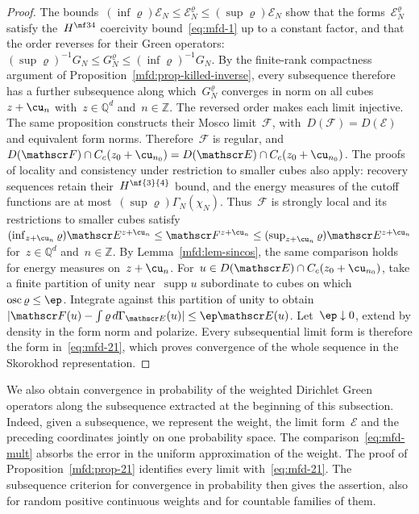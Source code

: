 \documentclass[11pt]{amsart}
\begin{document}
\begin{proof}
The bounds~$(\inf\varrho)\mathscr E_N\leq \mathscr E_N^\varrho\leq(\sup\varrho)\mathscr E_N$ show that the forms~$\mathscr E_N^\varrho$ satisfy the~$H^{\nf34}$ coercivity bound~\eqref{eq:mfd-1} up to a constant factor, and that the order reverses for their Green operators:~$(\sup\varrho)^{-1}G_N\leq G_N^\varrho\leq(\inf\varrho)^{-1}G_N$. By the finite-rank compactness argument of Proposition~\ref{mfd:prop-killed-inverse}, every subsequence therefore has a further subsequence along which~$G_N^\varrho$ converges in norm on all cubes~$z+\cu_n$ with~$z\in\mathbb Q^d$ and~$n\in\mathbb Z$. The reversed order makes each limit injective. The same proposition constructs their Mosco limit~$\mathscr F$, with~$D(\mathscr F)=D(\mathscr E)$ and equivalent form norms. Therefore~$\mathscr F$ is regular, and~$D(\mathscr F)\cap C_c(z_0+\cu_{n_0})=D(\mathscr E)\cap C_c(z_0+\cu_{n_0})$. The proofs of locality and consistency under restriction to smaller cubes also apply: recovery sequences retain their~$H^{\nf{3}{4}}$ bound, and the energy measures of the cutoff functions are at most~$(\sup\varrho)\Gamma_N(\chi_N)$. Thus~$\mathscr F$ is strongly local and its restrictions to smaller cubes satisfy~$(\inf_{z+\cu_n}\varrho)\mathscr E^{z+\cu_n}\leq \mathscr F^{z+\cu_n}\leq(\sup_{z+\cu_n}\varrho)\mathscr E^{z+\cu_n}$ for~$z\in\mathbb Q^d$ and~$n\in\mathbb Z$. By Lemma~\ref{mfd:lem-sincos}, the same comparison holds for energy measures on~$z+\cu_n$. For~$u\in D(\mathscr E)\cap C_c(z_0+\cu_{n_0})$, take a finite partition of unity near~$\operatorname{supp}u$ subordinate to cubes on which~$\operatorname{osc}\varrho\leq\ep$. Integrate against this partition of unity to obtain~$|\mathscr F(u)-\int\varrho\,d\Gamma_{\mathscr E}(u)|\leq\ep \mathscr E(u)$. Let~$\ep\downarrow0$, extend by density in the form norm and polarize. Every subsequential limit form is therefore the form in~\eqref{eq:mfd-21}, which proves convergence of the whole sequence in the Skorokhod representation.
\end{proof}

We also obtain convergence in probability of the weighted Dirichlet Green operators along the subsequence extracted at the beginning of this subsection. Indeed, given a subsequence, we represent the weight, the limit form~$\mathscr E$ and the preceding coordinates jointly on one probability space. The comparison~\eqref{eq:mfd-mult} absorbs the error in the uniform approximation of the weight. The proof of Proposition~\ref{mfd:prop-21} identifies every limit with~\eqref{eq:mfd-21}. The subsequence criterion for convergence in probability then gives the assertion, also for random positive continuous weights and for countable families of them.
\end{document}
